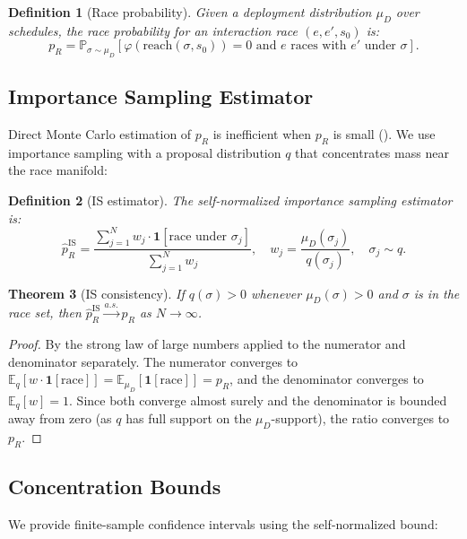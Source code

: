 \documentclass[11pt]{article}
\newtheorem{theorem}{Theorem}[section]
\newtheorem{definition}[theorem]{Definition}
\newcommand{\E}{\mathbb{E}}
\newcommand{\Prob}{\mathbb{P}}
\begin{document}
\begin{definition}[Race probability]
Given a deployment distribution $\mu_D$ over schedules, the \emph{race
probability} for an interaction race $(e, e', s_0)$ is:
\[
  p_R = \Prob_{\sigma \sim \mu_D}[\varphi(\mathrm{reach}(\sigma, s_0)) = 0
  \text{ and } e \text{ races with } e' \text{ under } \sigma].
\]
\end{definition}

\subsection{Importance Sampling Estimator}

Direct Monte Carlo estimation of $p_R$ is inefficient when $p_R$ is small
(). We use importance sampling with a proposal
distribution $q$ that concentrates mass near the race manifold:

\begin{definition}[IS estimator]
The self-normalized importance sampling estimator is:
\[
  \hat{p}_R^{\text{IS}} = \frac{\sum_{j=1}^{N} w_j \cdot \mathbf{1}[\text{race under } \sigma_j]}
  {\sum_{j=1}^{N} w_j},
  \quad w_j = \frac{\mu_D(\sigma_j)}{q(\sigma_j)},
  \quad \sigma_j \sim q.
\]
\end{definition}

\begin{theorem}[IS consistency]
\label{thm:is-consistent}
If $q(\sigma) > 0$ whenever $\mu_D(\sigma) > 0$ and $\sigma$ is in the
race set, then $\hat{p}_R^{\text{IS}} \xrightarrow{a.s.} p_R$ as $N \to \infty$.
\end{theorem}

\begin{proof}
By the strong law of large numbers applied to the numerator and denominator
separately. The numerator converges to $\E_q[w \cdot \mathbf{1}[\text{race}]]
= \E_{\mu_D}[\mathbf{1}[\text{race}]] = p_R$, and the denominator converges
to $\E_q[w] = 1$. Since both converge almost surely and the denominator is
bounded away from zero (as $q$ has full support on the $\mu_D$-support),
the ratio converges to $p_R$.
\end{proof}

\subsection{Concentration Bounds}

We provide finite-sample confidence intervals using the self-normalized bound:
\end{document}
